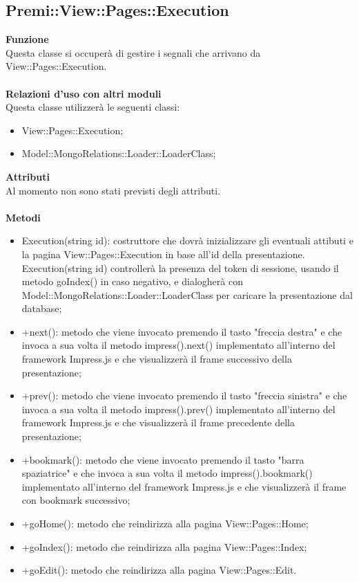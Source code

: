 {				\subsection{Premi::View::Pages::Execution}{
					\textbf{Funzione}\\
					\indent Questa classe si occuperà di gestire i segnali che arrivano da View::Pages::Execution.\\\\
					\textbf{Relazioni d'uso con altri moduli}\\
					\indent Questa classe utilizzerà le seguenti classi:
					\begin{itemize}
						\item View::Pages::Execution;
						\item Model::MongoRelations::Loader::LoaderClass;
					\end{itemize}
					\textbf{Attributi}\\
					\indent Al momento non sono stati previsti degli attributi.\\\\
					\textbf{Metodi}
					\begin{itemize}
						\item Execution(string id): costruttore che dovrà inizializzare gli eventuali attibuti e la pagina View::Pages::Execution in base all'id della presentazione. Execution(string id) controllerà la presenza del token di sessione, usando il metodo goIndex() in caso negativo, e dialogherà con Model::MongoRelations::Loader::LoaderClass per caricare la presentazione dal database;
						\item +next(): metodo che viene invocato premendo il tasto "freccia destra" e che invoca a sua volta il metodo impress().next() implementato all'interno del framework Impress.js e che visualizzerà il frame successivo della presentazione;
						\item +prev(): metodo che viene invocato premendo il tasto "freccia sinistra" e che invoca a sua volta il metodo impress().prev() implementato all'interno del framework Impress.js e che visualizzerà il frame precedente della presentazione;
						\item +bookmark(): metodo che viene invocato premendo il tasto "barra spaziatrice" e che invoca a sua volta il metodo impress().bookmark() implementato all'interno del framework Impress.js e che visualizzerà il frame con bookmark successivo;
						\item +goHome(): metodo che reindirizza alla pagina View::Pages::Home;
						\item +goIndex(): metodo che reindirizza alla pagina View::Pages::Index;
						\item +goEdit(): metodo che reindirizza alla pagina View::Pages::Edit.
					\end{itemize}
				}
}
